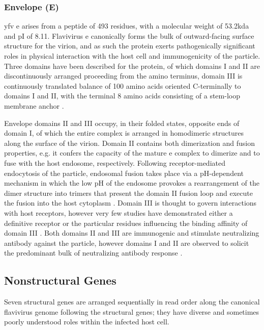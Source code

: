\subsubsection{Envelope (E)}
\Gls{yfv} \gls{e} arises from a peptide of 493 residues, with a molecular weight of 53.2\gls{kda} and pI of 8.11. Flavivirus \gls{e} canonically forms the bulk of outward-facing surface structure for the virion, and as such the protein exerts pathogenically significant roles in physical interaction with the host cell and immunogenicity of the particle. Three domains have been described for the protein, of which domains I and II are discontinuously arranged proceeding from the amino terminus, domain III is continuously translated balance of 100 amino acids oriented C-terminally to domains I and II, with the terminal 8 amino acids consisting of a stem-loop membrane anchor \parencite{Monath:2013cu}.

Envelope domains II and III occupy, in their folded states, opposite ends of domain I, of which the entire complex is arranged in homodimeric structures along the surface of the virion. Domain II contains both dimerization and fusion properties, e.g. it confers the capacity of the mature \gls{e} complex to dimerize and to fuse with the host endosome, respectively. Following receptor-mediated endocytosis of the particle, endosomal fusion takes place via a pH-dependent mechanism in which the low pH of the endosome provokes a rearrangement of the dimer structure into trimers that present the domain II fusion loop and execute the fusion into the host cytoplasm \parencite{Monath:2013cu}. Domain III is thought to govern interactions with host receptors, however very few studies have demonstrated either a definitive receptor or the particular residues influencing the binding affinity of domain III \parencite{Lee:2008gd}. Both domains II and III are immunogenic and stimulate neutralizing antibody against the particle, however domains I and II are observed to solicit the predominant bulk of neutralizing antibody response \parencite{Vratskikh:2013gk}.

\subsection{Nonstructural Genes}
Seven structural genes are arranged sequentially in read order along the canonical flavivirus genome following the structural genes; they have diverse and sometimes poorly understood roles within the infected host cell.

